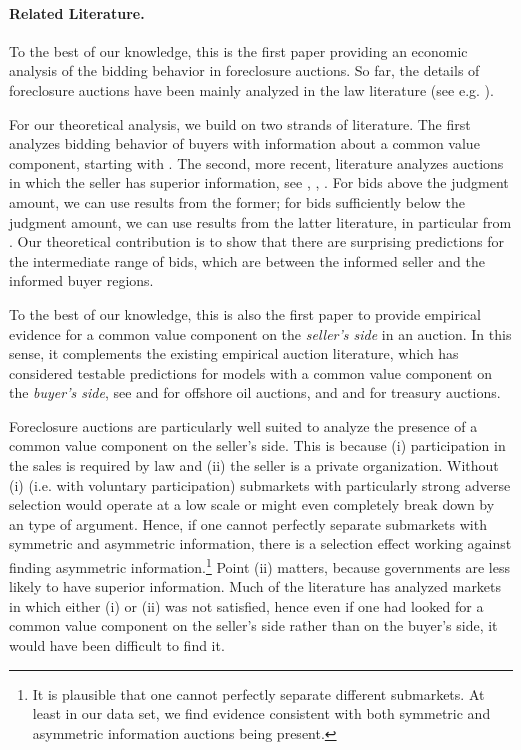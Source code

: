 \documentclass[11pt,twopage]{article}
\begin{document}
%
\paragraph{Related Literature.} To the best of our knowledge, this is
the first paper providing an economic analysis of the bidding behavior
in foreclosure auctions. So far, the details of foreclosure auctions
have been mainly analyzed in the law literature (see
e.g. \cite{nelson2004reforming}).

For our theoretical analysis, we build on two strands of
literature. The first analyzes bidding behavior of buyers with
information about a common value component, starting with
\cite{milgrom1982theory}. The second, more recent, literature analyzes
auctions in which the seller has superior information, see
\cite{jullien2006auction}, \cite{cai2007reserve}, \cite{lamy}. For
bids above the judgment amount, we can use results from the former;
for bids sufficiently below the judgment amount, we can use results
from the latter literature, in particular from
\cite{cai2007reserve}. Our theoretical contribution is to show that
there are surprising predictions for the intermediate range of bids,
which are between the informed seller and the informed buyer regions.

To the best of our knowledge, this is also the first paper to provide
empirical evidence for a common value component on the \emph{seller's
  side} in an auction. In this sense, it complements the existing
empirical auction literature, which has considered testable predictions for models with a common value
component on the \emph{buyer's side}, see
\cite{hendricks1988empirical} and \cite{hendricks2003empirical} for
offshore oil auctions, and \cite{nyborg2002bidder} and
\cite{hortaccsu2012valuing} for treasury auctions.

Foreclosure auctions are particularly well suited to analyze the presence of
a common value component
on the seller's side. This is because (i) participation in the sales
is required by law and (ii) the seller is a private
organization. Without (i) (i.e. with voluntary participation)
submarkets with particularly strong adverse selection would operate at
a low scale or might even completely break down by an
\cite{akerlof1970market} type of argument. Hence, if one cannot
perfectly separate submarkets with symmetric and asymmetric
information, there is a selection effect working against finding
asymmetric information.\footnote{It is plausible that one cannot
  perfectly separate different submarkets. At least in our data set,
  we find evidence consistent with both symmetric and asymmetric
  information auctions being present.} Point (ii) matters, because
governments are less likely to have superior information. Much of the
literature has analyzed markets in which either (i) or (ii) was not
satisfied, hence even if one had looked for a common value component on
the seller's side rather than on the buyer's side, it would have been difficult 
to find it.
\end{document}
